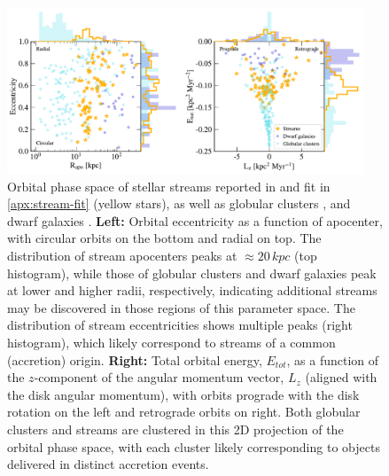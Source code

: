 \documentclass[final,5p,times,twocolumn,authoryear]{elsarticle}
\begin{document}
\begin{figure}
\begin{center}
\includegraphics[width=0.95\textwidth]{figures/orbital_phase_space.pdf}
\end{center}
\caption{%
Orbital phase space of stellar streams reported in \citet{ibata:2023} and fit in \ref{apx:stream-fit} (yellow stars), as well as globular clusters \citep[light blue circles,][]{baumgardt:2019}, and dwarf galaxies \citep[dark blue circles,][]{helmi:2018,simon:2018}.
\textbf{Left:} Orbital eccentricity as a function of apocenter, with circular orbits on the bottom and radial on top.
The distribution of stream apocenters peaks at $\approx20\,\unit{kpc}$ (top histogram), while those of globular clusters and dwarf galaxies peak at lower and higher radii, respectively, indicating additional streams may be discovered in those regions of this parameter space.
The distribution of stream eccentricities shows multiple peaks (right histogram), which likely correspond to streams of a common (accretion) origin.
\textbf{Right:} Total orbital energy, $E_{tot}$, as a function of the $z$-component of the angular momentum vector, $L_z$ (aligned with the disk angular momentum), with orbits prograde with the disk rotation on the left and retrograde orbits on right.
Both globular clusters and streams are clustered in this 2D projection of the orbital phase space, with each cluster likely corresponding to objects delivered in distinct accretion events.
}
\label{fig:phase_space}
\end{figure}
\end{document}
